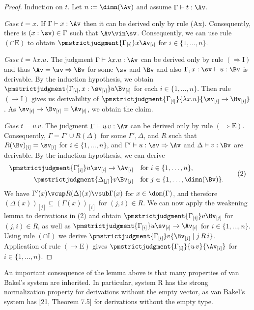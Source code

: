 \begin{proof}
Induction on $t$. Let $n:=\dimn(\Av)$ and assume $\Gamma\vdash t:\Av$.\par
\emph{Case $t=x$.} If $\Gamma\vdash x:\Av$ then it can be derived only by rule (Ax). Consequently, there is $(x:\sv)\in\Gamma$ such that $\Av\vin\sv$. Consequently, we can use rule $(\cap\mathrm E)$ to obtain $\pmstrictjudgment{\Gamma_{[i]}}x{\Av_{[i]}}$ for $i\in\{1,\ldots,n\}$.\par
\emph{Case $t=\lambda x.u$.} The judgment $\Gamma\vdash\lambda x.u:\Av$ can be derived only by rule $(\Rightarrow\mathrm I)$ and thus $\Av=\sv\Rightarrow\Bv$ for some $\sv$ and $\Bv$ and also $\Gamma,x:\sv\vdash u:\Bv$ is derivable. By the induction hypothesis, we obtain $\pmstrictjudgment{\Gamma_{[i]},x:\sv_{[i]}}u{\Bv_{[i]}}$ for each $i\in\{1,\ldots,n\}$. Then rule $(\to\mathrm I)$ gives us derivability of $\pmstrictjudgment{\Gamma_{[i]}}{\lambda x.u}{\sv_{[i]}\to\Bv_{[i]}}$. As $\sv_{[i]}\to\Bv_{[i]}=\Av_{[i]}$, we obtain the claim.\par
\emph{Case $t=u\,v$.} The judgment $\Gamma\vdash u\,v:\Av$ can be derived only by rule $(\Rightarrow\mathrm E)$. Consequently, $\Gamma=\Gamma'\cup R(\Delta)$ for some $\Gamma',\Delta$, and $R$ such that $R(\Bv)_{[i]}=\sv_{[i]}$ for $i\in\{1,\ldots,n\}$, and $\Gamma'\vdash u:\sv\Rightarrow\Av$ and $\Delta\vdash v:\Bv$ are derivable. By the induction hypothesis, we can derive
\begin{equation*}\begin{aligned}
\pmstrictjudgment{\Gamma'_{[i]}}u{\sv_{[i]}\to\Av_{[i]}}&\quad\text{for }i\in\{1,\ldots,n\},\\
\pmstrictjudgment{\Delta_{[j]}}v{\Bv_{[j]}}&\quad\text{for }j\in\{1,\ldots,\dimn(\Bv)\}.
\end{aligned}\tag{2}\end{equation*}
We have $\Gamma'(x)\vcup R(\Delta)(x)\vsub\Gamma(x)$ for $x\in\dom(\Gamma)$, and therefore $(\Delta(x))_{[j]}\subseteq(\Gamma(x))_{[i]}$ for $(j,i)\in R$. We can now apply the weakening lemma to derivations in (2) and obtain $\pmstrictjudgment{\Gamma_{[i]}}v{\Bv_{[j]}}$ for $(j,i)\in R$, as well as $\pmstrictjudgment{\Gamma_{[i]}}u{\sv_{[i]}\to\Av_{[i]}}$ for $i\in\{1,\ldots,n\}$. Using rule $(\cap\mathrm I)$ we derive $\pmstrictjudgment{\Gamma_{[i]}}v{\{\Bv_{[j]}\mid j\,R\,i\}}$. Application of rule $(\to\mathrm E)$ gives $\pmstrictjudgment{\Gamma_{[i]}}{u\,v}{\Av_{[i]}}$ for $i\in\{1,\ldots,n\}$.
\end{proof}
An important consequence of the lemma above is that many properties of van Bakel's system are inherited. In particular, system R has the strong normalization property for derivations without the empty vector, as van Bakel's system has [21, Theorem 7.5] for derivations without the empty type.

